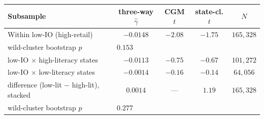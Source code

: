 \begin{tabular}{lcccc}
\hline\hline
Subsample & three-way $\hat\gamma$ & CGM $t$ & state-cl. $t$ & $N$ \\
\hline
Within low-IO (high-retail) & $-0.0148$ & $-2.08$ & $-1.75$ & $165,328$ \\
\quad wild-cluster bootstrap $p$ & \multicolumn{4}{l}{$0.153$} \\
\hline
\quad low-IO $\times$ high-literacy states & $-0.0113$ & $-0.75$ & $-0.67$ & $101,272$ \\
\quad low-IO $\times$ low-literacy states & $-0.0014$ & $-0.16$ & $-0.14$ & $64,056$ \\
\quad difference (low-lit $-$ high-lit), stacked & $0.0014$ & --- & $1.19$ & $165,328$ \\
\quad\quad wild-cluster bootstrap $p$ & \multicolumn{4}{l}{$0.277$} \\
\hline\hline
\end{tabular}
